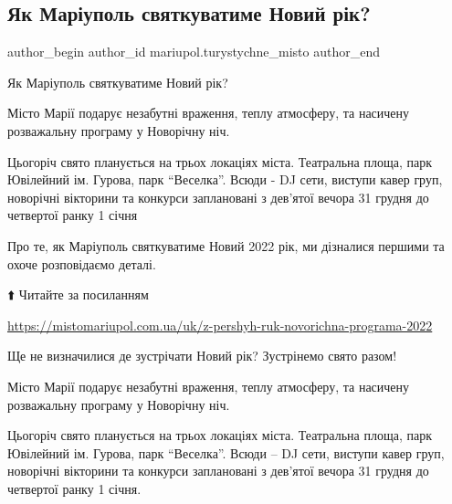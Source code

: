  
 
 
 
 

\subsection{Як Маріуполь святкуватиме Новий рік?}
\label{sec:29_12_2021.fb.mariupol.turystychne_misto.1.jak_mariupol_svjatkuvatyme_novyj_rik}

\ifcmt
 author_begin
   author_id mariupol.turystychne_misto
 author_end
\fi

Як Маріуполь святкуватиме Новий рік? 

Місто Марії подарує незабутні враження, теплу атмосферу, та насичену
розважальну програму у Новорічну ніч.

Цьогоріч свято планується на трьох локаціях міста. Театральна площа, парк
Ювілейний ім. Гурова, парк \enquote{Веселка}. Всюди - DJ сети, виступи кавер
груп, новорічні вікторини та конкурси заплановані з дев'ятої вечора 31 грудня
до четвертої ранку 1 січня

Про те, як Маріуполь святкуватиме Новий 2022 рік, ми дізналися першими та охоче
розповідаємо деталі. 

⬆️ Читайте за посиланням

\url{https://mistomariupol.com.ua/uk/z-pershyh-ruk-novorichna-programa-2022}

Ще не визначилися де зустрічати Новий рік? Зустрінемо свято разом!

Місто Марії подарує незабутні враження, теплу атмосферу, та насичену
розважальну програму у Новорічну ніч.


Цьогоріч свято планується на трьох локаціях міста. Театральна площа, парк
Ювілейний ім. Гурова, парк \enquote{Веселка}. Всюди – DJ сети, виступи кавер груп,
новорічні вікторини та конкурси заплановані з дев'ятої вечора 31 грудня  до
четвертої ранку 1 січня.

